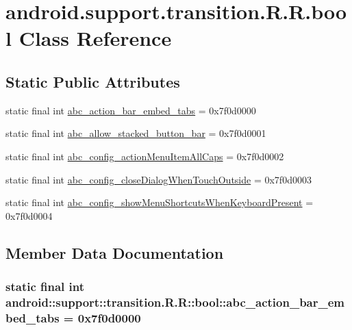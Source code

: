 \hypertarget{classandroid_1_1support_1_1transition_1_1_r_1_1bool}{
\section{android.support.transition.R.R.bool Class Reference}
\label{classandroid_1_1support_1_1transition_1_1_r_1_1bool}
}
\subsection*{Static Public Attributes}
\begin{CompactItemize}
\item 
static final int \hyperlink{classandroid_1_1support_1_1transition_1_1_r_1_1bool_80c4af6ba70df474854e5b051c09281b}{abc\_\-action\_\-bar\_\-embed\_\-tabs} = 0x7f0d0000
\item 
static final int \hyperlink{classandroid_1_1support_1_1transition_1_1_r_1_1bool_4f39d20b11d1428e38f2273600e3a8f8}{abc\_\-allow\_\-stacked\_\-button\_\-bar} = 0x7f0d0001
\item 
static final int \hyperlink{classandroid_1_1support_1_1transition_1_1_r_1_1bool_7c83d768468c9b4791ea67ff44d28949}{abc\_\-config\_\-actionMenuItemAllCaps} = 0x7f0d0002
\item 
static final int \hyperlink{classandroid_1_1support_1_1transition_1_1_r_1_1bool_74dfbd0257aafd335c4509e0c6e9bfe9}{abc\_\-config\_\-closeDialogWhenTouchOutside} = 0x7f0d0003
\item 
static final int \hyperlink{classandroid_1_1support_1_1transition_1_1_r_1_1bool_d00c63383a927e7162fb099b8f51c2f0}{abc\_\-config\_\-showMenuShortcutsWhenKeyboardPresent} = 0x7f0d0004
\end{CompactItemize}


\subsection{Member Data Documentation}
\hypertarget{classandroid_1_1support_1_1transition_1_1_r_1_1bool_80c4af6ba70df474854e5b051c09281b}{
\subsubsection[{abc\_\-action\_\-bar\_\-embed\_\-tabs}]{\setlength{\rightskip}{0pt plus 5cm}static final int android::support::transition.R.R::bool::abc\_\-action\_\-bar\_\-embed\_\-tabs = 0x7f0d0000}}
\label{classandroid_1_1support_1_1transition_1_1_r_1_1bool_80c4af6ba70df474854e5b051c09281b}


